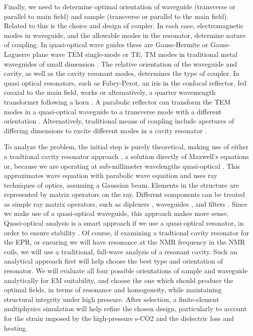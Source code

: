 Finally, we need to determine optimal orientation of waveguide (transverse or parallel to main field)
and sample (transverse or parallel to the main field). Related to this is the choice and design of coupler. In each case, electromagnetic modes in waveguide, and the allowable modes in the resonator, determine nature of coupling. In quasi-optical wave guides these are Gauss-Hermite or Gauss-Laguerre plane wave TEM single-mode \cite{goto2004teflon, han2002terahertz} or TE, TM modes in traditional metal waveguides of small dimension \cite{gallot2000terahertz}. The relative orientation of the waveguide and cavity, as well as the cavity resonant modes, determines the type of coupler. In quasi optical resonators, such as Fabry-Perot, an iris in the confocal reflector, fed coaxial to the main field, works \cite{denysenkov2012liquid} or alternatively, a quarter wavemength transformer following a horn \cite{strain1962millimeter}. A parabolic reflector can transform the TEM modes in a quasi-optical waveguide to a transverse mode with a different orientation \cite{vlasov1974quasioptical}. Alternatively, traditional means of coupling include apertures of differing dimensions to excite different modes in a cavity resonator \cite{balanis2012advanced}.

To analyze the problem, the initial step is purely theoretical, making use of either a tradtional cavity resonator approach \cite{balanis2012advanced}, a solution directly of Maxwell's equations or, because we are operating at sub-millimeter wavelengths quasi-optical \cite{goldsmith1980quasi}. This approximates wave equation with parabolic wave equation and uses ray techniques of optics, assuming a Gaussian beam. Elements in the structure are represented by matrix operators on the ray. Different components can be treated as simple ray matrix operators, such as diplexers \cite{arnaud1975resonant}, waveguides \cite{gallot2000terahertz}, and filters \cite{goldsmith1980quasi, tomaselli1981far}. Since we make use of a quasi-optical waveguide, this approach makes more sense. Quasi-optical analysis is a smart approach if we use a quasi-optical resonator, in order to ensure stability \cite{kogelnik1966laser,siegman1967modes}. Of course, if examining a tradtional cavity resonator for the EPR, or ensuring we will have resonance at the NMR frequency in the NMR coils, we will use a traditional, full-wave analysis of a resonant cavity. Such an analytical approach first will help choose the best type and orientation of resonator. We will evaluate all four possible orientations of sample and waveguide analytically for EM suitability, and choose the one which should produce the optimal fields, in terms of resonance and homogeneity, while maintaining structural integrity under high pressure. After selection, a finite-element multiphysics simulation will help refine the chosen design, particularly to account for the strain imposed by the high-pressure s-CO2 and the dielectric loss and heating.

